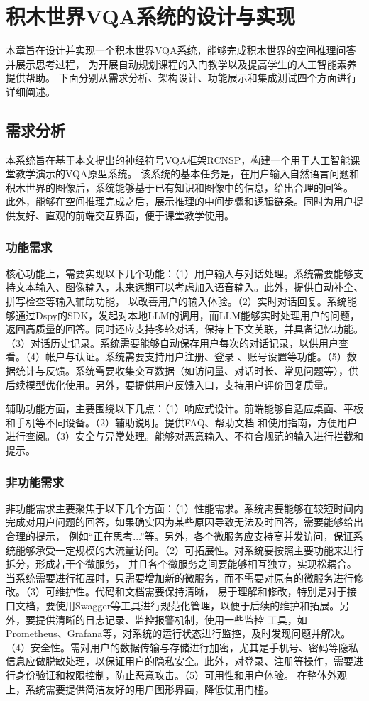 \chapter{积木世界VQA系统的设计与实现}
本章旨在设计并实现一个积木世界VQA系统，能够完成积木世界的空间推理问答并展示思考过程，
为开展自动规划课程的入门教学以及提高学生的人工智能素养提供帮助。
下面分别从需求分析、架构设计、功能展示和集成测试四个方面进行详细阐述。
\section{需求分析}
本系统旨在基于本文提出的神经符号VQA框架RCNSP，构建一个用于人工智能课堂教学演示的VQA原型系统。
该系统的基本任务是，在用户输入自然语言问题和积木世界的图像后，系统能够基于已有知识和图像中的信息，给出合理的回答。
此外，能够在空间推理完成之后，展示推理的中间步骤和逻辑链条。同时为用户提供友好、直观的前端交互界面，便于课堂教学使用。

\subsection{功能需求}
核心功能上，需要实现以下几个功能：（1）用户输入与对话处理。系统需要能够支持文本输入、图像输入，未来远期可以考虑加入语音输入。此外，提供自动补全、拼写检查等输入辅助功能，
以改善用户的输入体验。（2）实时对话回复。系统能够通过Dspy的SDK，发起对本地LLM的调用，而LLM能够实时处理用户的问题，返回高质量的回答。同时还应支持多轮对话，保持上下文关联，并具备记忆功能。（3）对话历史记录。系统需要能够自动保存用户每次的对话记录，以供用户查看。（4）帐户与认证。系统需要支持用户注册、登录
、账号设置等功能。（5）数据统计与反馈。系统需要收集交互数据（如访问量、对话时长、常见问题等），供后续模型优化使用。另外，要提供用户反馈入口，支持用户评价回复质量。

辅助功能方面，主要围绕以下几点：（1）响应式设计。前端能够自适应桌面、平板和手机等不同设备。（2）辅助说明。提供FAQ、帮助文档
和使用指南，方便用户进行查阅。（3）安全与异常处理。能够对恶意输入、不符合规范的输入进行拦截和提示。
\subsection{非功能需求}
非功能需求主要聚焦于以下几个方面：（1）性能需求。系统需要能够在较短时间内完成对用户问题的回答，如果确实因为某些原因导致无法及时回答，需要能够给出合理的提示，
例如“正在思考...”等。另外，各个微服务应支持高并发访问，保证系统能够承受一定规模的大流量访问。（2）可拓展性。对系统要按照主要功能来进行拆分，形成若干个微服务，
并且各个微服务之间要能够相互独立，实现松耦合。当系统需要进行拓展时，只需要增加新的微服务，而不需要对原有的微服务进行修改。（3）可维护性。代码和文档需要保持清晰，
易于理解和修改，特别是对于接口文档，要使用Swagger等工具进行规范化管理，以便于后续的维护和拓展。另外，要提供清晰的日志记录、监控报警机制，使用一些监控
工具，如Prometheus、Grafana等，对系统的运行状态进行监控，及时发现问题并解决。（4）安全性。需对用户的数据传输与存储进行加密，尤其是手机号、密码等隐私信息应做脱敏处理，以保证用户的隐私安全。此外，对登录、注册等操作，需要进行身份验证和权限控制，防止恶意攻击。（5）可用性和用户体验。
在整体外观上，系统需要提供简洁友好的用户图形界面，降低使用门槛。


